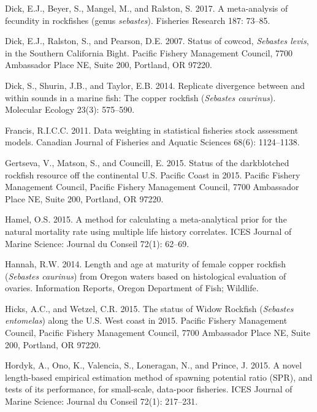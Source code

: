 \documentclass[11pt,
  english,
  a4paper,
]{article}
\newlength{\cslhangindent}
\newenvironment{CSLReferences}[2] %
 {%
  \setlength{\parindent}{0pt}
  \ifodd #1 \everypar{\setlength{\hangindent}{\cslhangindent}}\ignorespaces\fi
  \ifnum #2 > 0
  \setlength{\parskip}{#2\baselineskip}
  \fi
 }%
 {}
\begin{document}
\begin{CSLReferences}{1}{0}
\leavevmode{}%
Dick, E.J., Beyer, S., Mangel, M., and Ralston, S. 2017. A meta-analysis of fecundity in rockfishes (genus \emph{sebastes}). Fisheries Research 187: 73--85.

\leavevmode{}%
Dick, E.J., Ralston, S., and Pearson, D.E. 2007. Status of cowcod, \emph{{Sebastes} levis}, in the {Southern} {California} {Bight}. Pacific Fishery Management Council, 7700 Ambassador Place NE, Suite 200, Portland, OR 97220.

\leavevmode{}%
Dick, S., Shurin, J.B., and Taylor, E.B. 2014. Replicate divergence between and within sounds in a marine fish: The copper rockfish (\emph{{Sebastes} caurinus}). Molecular Ecology 23(3): 575--590.

\leavevmode{}%
Francis, R.I.C.C. 2011. Data weighting in statistical fisheries stock assessment models. Canadian Journal of Fisheries and Aquatic Sciences 68(6): 1124--1138.

\leavevmode{}%
Gertseva, V., Matson, S., and Councill, E. 2015. Status of the darkblotched rockfish resource off the continental {U}.{S}. {Pacific} {Coast} in 2015. Pacific Fishery Management Council, Pacific Fishery Management Council, 7700 Ambassador Place NE, Suite 200, Portland, OR 97220.

\leavevmode{}%
Hamel, O.S. 2015. A method for calculating a meta-analytical prior for the natural mortality rate using multiple life history correlates. ICES Journal of Marine Science: Journal du Conseil 72(1): 62--69.

\leavevmode{}%
Hannah, R.W. 2014. Length and age at maturity of female copper rockfish (\emph{{Sebastes} caurinus}) from {Oregon} waters based on histological evaluation of ovaries. Information Reports, Oregon Department of Fish; Wildlife.

\leavevmode{}%
Hicks, A.C., and Wetzel, C.R. 2015. The status of {Widow} {Rockfish} (\emph{{Sebastes} entomelas}) along the {U}.{S}. West coast in 2015. Pacific Fishery Management Council, Pacific Fishery Management Council, 7700 Ambassador Place NE, Suite 200, Portland, OR 97220.

\leavevmode{}%
Hordyk, A., Ono, K., Valencia, S., Loneragan, N., and Prince, J. 2015. A novel length-based empirical estimation method of spawning potential ratio ({SPR}), and tests of its performance, for small-scale, data-poor fisheries. ICES Journal of Marine Science: Journal du Conseil 72(1): 217--231.


\end{CSLReferences}
\end{document}
